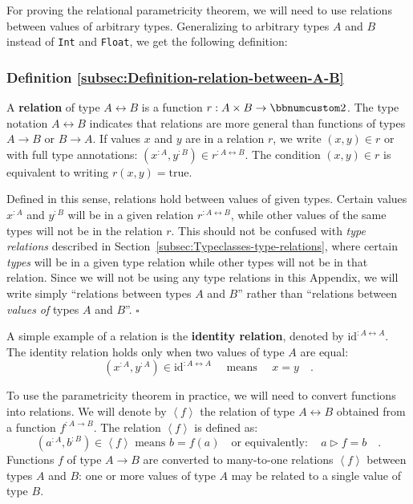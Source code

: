 For proving the relational parametricity theorem, we will need to
use relations between values of arbitrary types. Generalizing to arbitrary
types $A$ and $B$ instead of \lstinline!Int! and \lstinline!Float!,
we get the following definition:

\subsubsection{Definition \label{subsec:Definition-relation-between-A-B}\ref{subsec:Definition-relation-between-A-B}}

A \textbf{relation} of
type $A\leftrightarrow B$ is a function $r:A\times B\rightarrow\bbnum 2$.
The type notation $A\leftrightarrow B$ indicates that relations are
more general than functions of types $A\rightarrow B$ or $B\rightarrow A$.
If values $x$ and $y$ are in a relation $r$, we write $(x,y)\in r$
or with full type annotations: $(x^{:A},y^{:B})\in r^{:A\leftrightarrow B}$.
The condition $(x,y)\in r$ is equivalent to writing $r(x,y)=\text{true}$. 

Defined in this sense, relations hold between values of given types.
Certain values $x^{:A}$ and $y^{:B}$ will be in a given relation
$r^{:A\leftrightarrow B}$, while other values of the same types will
not be in the relation $r$. This should not be confused with \emph{type
relations} described in Section~\ref{subsec:Typeclasses-type-relations},
where certain \emph{types} will be in a given type relation while
other types will not be in that relation. Since we will not be using
any type relations in this Appendix, we will write simply \textsf{``}relations
between types $A$ and $B$\textsf{''} rather than \textsf{``}relations between \emph{values
of} types $A$ and $B$\textsf{''}. $\square$

A simple example of a relation is the \textbf{identity relation},
denoted by $\text{id}^{:A\leftrightarrow A}$. The identity relation
holds only when two values of type $A$ are equal:
\[
(x^{:A},y^{:A})\in\text{id}^{:A\leftrightarrow A}\quad\text{ means }\quad x=y\quad.
\]

To use the parametricity theorem in practice, we will need to convert
functions into relations. We will denote by $\left<f\right>$ the
relation of type $A\leftrightarrow B$ obtained from a function $f^{:A\rightarrow B}$.
The relation $\left<f\right>$ is defined as:
\[
(a^{:A},b^{:B})\in\left<f\right>\text{ means }b=f(a)\quad\text{or equivalently}:\quad a\triangleright f=b\quad.
\]
Functions $f$ of type $A\rightarrow B$ are converted to many-to-one
relations $\left<f\right>$ between types $A$ and $B$: one or more
values of type $A$ may be related to a single value of type $B$.

